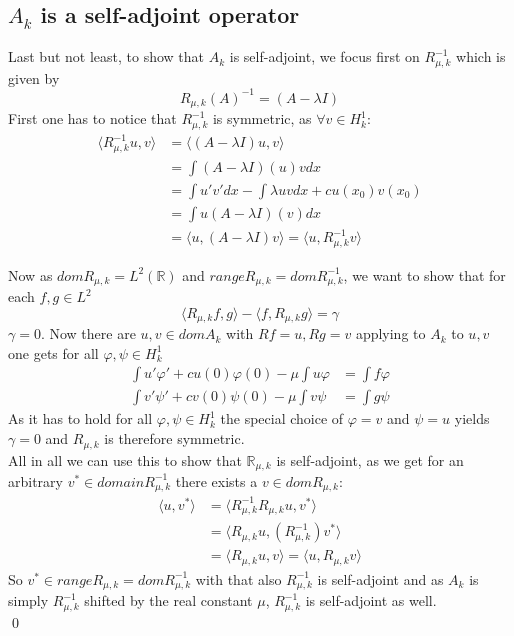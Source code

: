 \documentclass[14pt,a4paper]{scrartcl}
\numberwithin{equation}{section}
\newcommand{\R}{\mathbb{R}}
\begin{document}
\newpage

\subsection{$A_{k}$ is a self-adjoint operator}
Last but not least, to show that $A_{k}$ is self-adjoint, we focus first on $R_{\mu, k}^{-1}$ which is given by 
	\[ R_{\mu, k}(A)^{-1} = (A - \lambda I) \] 
First one has to notice that $R_{\mu, k}^{-1}$ is symmetric, as $\forall v \in H^{1}_{k}$:
\begin{align*}
	\langle R_{\mu, k}^{-1} u, v \rangle & = \langle (A - \lambda I) u, v \rangle \\
		& = \int (A - \lambda I)(u) v dx \\
		& = \int u'v' dx - \int \lambda u v dx + c u(x_{0}) v(x_{0}) \\
		& = \int u (A - \lambda I)(v) dx \\
		& = \langle u, (A - \lambda I) v \rangle = \langle u,  R_{\mu, k}^{-1} v \rangle 
\end{align*}

Now as $dom R_{\mu, k} = L^{2}(\R)$ and $range R_{\mu, k} = dom R_{\mu, k}^{-1}$, we want to show that for each $f, g \in L^{2}$
\[ \langle R_{\mu, k} f, g \rangle - \langle f, R_{\mu, k} g  \rangle = \gamma \]
$\gamma = 0$. Now there are $u, v \in dom A_{k}$ with $Rf = u, Rg = v$ applying to $A_{k}$ to $u, v$ one gets for all $\varphi, \psi \in H^{1}_{k}$
\begin{align*}
	\int u' \varphi' + c u(0) \varphi(0) - \mu \int u \varphi & = \int f \varphi \\
	\int v' \psi' + c v(0) \psi(0) - \mu \int v \psi & = \int g \psi
\end{align*}
As it has to hold for all $\varphi, \psi \in H^{1}_{k}$ the special choice of $\varphi = v$ and $\psi = u$ yields $\gamma = 0$ and $R_{\mu, k}$ is therefore symmetric. \\
All in all we can use this to show that $\R_{\mu, k}$ is self-adjoint, as we get for an arbitrary $v^{*} \in domain R_{\mu, k}^{-1}$ there exists a $v \in dom R_{\mu, k}$:
\begin{align*}
	\langle u, v^{*} \rangle & = \langle R_{\mu, k}^{-1} R_{\mu, k} u , v^{*} \rangle \\
		& = \langle R_{\mu, k} u, (R_{\mu, k}^{-1}) v^{*} \rangle \\
		& = \langle R_{\mu, k} u, v \rangle  = \langle  u, R_{\mu, k} v \rangle 
\end{align*}
So $v^{*} \in range R_{\mu, k} = dom R_{\mu, k}^{-1}$ with that also $R_{\mu, k}^{-1}$ is self-adjoint and as $A_{k}$ is simply $R_{\mu, k}^{-1}$ shifted by the real constant $\mu$, $R_{\mu, k}^{-1}$ is self-adjoint as well. \\
\hfill \qed
\end{document}
